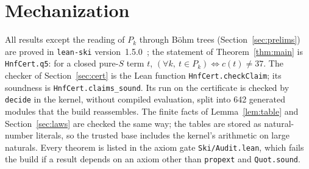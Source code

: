 \documentclass[11pt]{amsart}
\theoremstyle{definition}
\theoremstyle{remark}
\newcommand{\lean}[1]{\texttt{#1}}
\begin{document}
\section*{Mechanization}
All results except the reading of $P_k$ through B\"ohm trees (Section~\ref{sec:prelims}) are
proved in \texttt{lean-ski} version~1.5.0~\citep{leanski}; the statement
of Theorem~\ref{thm:main} is \lean{HnfCert.q5}:
for a closed pure-$S$ term $t$, $(\forall k,\ t\in P_k)\iff c(t)\ne37$. The checker of
Section~\ref{sec:cert} is the Lean function \lean{HnfCert.checkClaim}; its soundness is
\lean{HnfCert.claims\_sound}. Its run on the certificate is checked by
\texttt{decide} in the kernel, without compiled evaluation, split into 642 generated
modules that the build reassembles. The finite facts of Lemma~\ref{lem:table} and
Section~\ref{sec:laws} are checked the same way; the tables are stored as natural-number
literals, so the trusted base includes the kernel's arithmetic on large naturals. Every
theorem is listed in the axiom gate \texttt{Ski/Audit.lean}, which fails the build if a
result depends on an axiom other than \texttt{propext} and \texttt{Quot.sound}.



\end{document}
